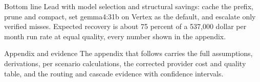 \documentclass[11pt]{uce-report}
\begin{document}
\begin{ucecallout}{Bottom line}
Lead with model selection and structural savings: cache the prefix, prune and compact, set gemma4:31b on Vertex as the default, and escalate only verified misses. Expected recovery is about 75 percent of a 537,000 dollar per month run rate at equal quality, every number shown in the appendix.

\end{ucecallout}
\begin{ucecallout}{Appendix and evidence}
The appendix that follows carries the full assumptions, derivations, per scenario calculations, the corrected provider cost and quality table, and the routing and cascade evidence with confidence intervals.

\end{ucecallout}
\end{document}
